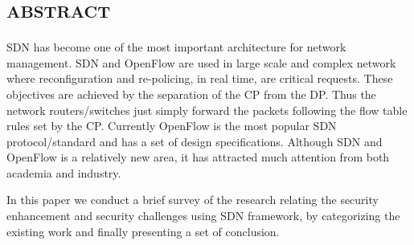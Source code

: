 %
\section*{\small \textsc{abstract}}
\ac{SDN} has become one of the most important architecture for network management. \ac{SDN} and OpenFlow are used in large scale and complex network where reconfiguration and re-policing, in real time, are critical requests. These objectives are achieved by the separation of the \ac{CP} from the \ac{DP}. Thus the network routers/switches just simply forward the packets following the flow table rules set by the \ac{CP}. Currently OpenFlow is the most popular \ac{SDN} protocol/standard and has a set of design specifications. Although \ac{SDN} and OpenFlow is a relatively new area, it has attracted much attention from both academia and industry.

In this paper we conduct a brief survey of the research relating the security enhancement and security challenges using \ac{SDN} framework, by categorizing the existing work and finally presenting a set of conclusion.